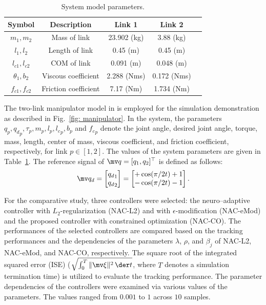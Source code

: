 \documentclass[letterpaper, 10 pt, conference]{ieeeconf}  %
\begin{document}
\begin{table}[!t]
    \renewcommand{\arraystretch}{1.3}
    \caption{System model parameters.}
    \centering
    \begin{tabular}{|c||c|c|c|c|}
    \hline
    Symbol & \textbf{Description} & \textbf{Link 1} & \textbf{Link 2} \\
    \hline 
    $m_1, m_2$ & Mass of link    & 23.902 (kg) & 3.88 (kg) \\
    \hline
    $l_1, l_2$  & Length of link   & 0.45 (m) & 0.45 (m) \\
    \hline
    $l_{c1}, l_{c2}$ & COM of link  & 0.091 (m) & 0.048 (m) \\
    \hline
    $\theta_1, b_2$   & Viscous coefficient  &  2.288 (Nms) & 0.172 (Nms) \\
    \hline
    $f_{c1}, f_{c2}$  & Friction coefficient &  7.17 (Nm) & 1.734 (Nm) \\
    \hline
    \end{tabular}
    \label{table: system parameters}
\end{table}

The two-link manipulator model in \cite{RN33} is employed for the simulation demonstration as described in Fig.~\ref{fig: manipulator}.
In the system, the parameters $q_p,{q_d}_p,\tau_p,m_p,l_p,{l_c}_p,b_p$ and ${f_c}_p$ denote the joint angle, desired joint angle, torque, mass, length, center of mass, viscous coefficient, and friction coefficient, respectively, for link $p\in[1,2]$.
The values of the system parameters are given in Table~\ref{table: system parameters}.
The reference signal of $\mv q=[q_1,q_2]^\top $ is defined as follows:
\begin{equation}
    \mv q_d
    =
    \begin{bmatrix}
        {q_d}_1\\
        {q_d}_2
    \end{bmatrix}
    = 
    \begin{bmatrix}
        +\cos(\pi/2 t) + 1 \\
        -\cos(\pi/2 t) - 1 
    \end{bmatrix}
    .
\end{equation}

For the comparative study, three controllers were selected: the neuro–adaptive controller with $L_2$-regularization (NAC-L2) and with $\epsilon$-modification (NAC-eMod) and the proposed controller with constrained optimization (NAC-CO).
The performances of the selected controllers are compared based on the tracking performances and the dependencies of the parameters $\lambda$, $\rho$, and $\beta_j$ of NAC-L2, NAC-eMod, and NAC-CO, respectively.
The square root of the integrated squared error (ISE) (\ie $\sqrt{\int_0^T \Vert\mv \xi\Vert^2\,\der t}$, where $T$ denotes a simulation termination time) is utilized to evaluate the tracking performance.
The parameter dependencies of the controllers were examined via various values of the parameters. 
The values ranged from $0.001$ to $1$ across $10$ samples.
\end{document}
